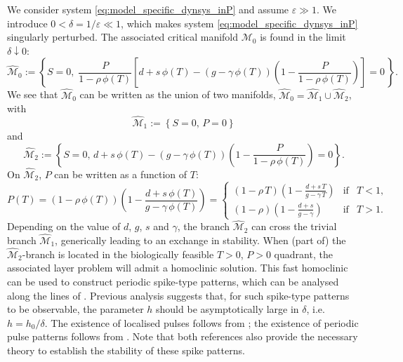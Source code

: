\documentclass[a4paper,10pt,abstract=true,parskip=true]{scrartcl}
\theoremstyle{remark}
\numberwithin{equation}{section}
\numberwithin{thm}{section}
\newcommand{\eps}{\varepsilon}
\begin{document}
We consider system \eqref{eq:model_specific_dynsys_inP} and assume $\eps \gg 1$. We introduce $0<\delta = 1/\eps \ll 1$, which makes system \eqref{eq:model_specific_dynsys_inP} singularly perturbed. The associated critical manifold $\mathcal{M}_0$ is found in the limit $\delta \downarrow 0$:
\begin{equation}\label{eq:slowtox_C0}
    \hat{\mathcal{M}}_0 := \left\{S = 0,\; \frac{P}{1 - \rho\,\phi(T)}\left[d+s\,\phi(T) - \left(g - \gamma\,\phi(T)\right)\left(1-\frac{P}{1 - \rho\,\phi(T)}\right)\right] = 0\,\right\}.
\end{equation}
We see that $\hat{\mathcal{M}}_0$ can be written as the union of two manifolds, $\hat{\mathcal{M}}_0 = \hat{\mathcal{M}}_1 \cup \hat{\mathcal{M}}_2$,
with
\begin{equation}
 \hat{\mathcal{M}}_1 := \left\{ S = 0,\,P = 0\right\}
\end{equation}
and
\begin{equation}
    \hat{\mathcal{M}}_2 := \left\{S=0,\,d+s\,\phi(T) - \left(g - \gamma\,\phi(T)\right)\left(1-\frac{P}{1 - \rho\,\phi(T)}\right) = 0\right\}.
\end{equation}
On $\hat{\mathcal{M}}_2$, $P$ can be written as a function of $T$:
\begin{equation}\label{eq:slowtox_C0_PinT}
    P(T) = \left(1-\rho\,\phi(T)\right) \left(1-\frac{d + s\, \phi(T)}{g-\gamma\,\phi(T)}\right)= \left\{ \begin{array}{rcl} \left(1-\rho\,T\right) \left(1-\frac{d + s\, T}{g-\gamma\,T}\right) & \text{if} & T<1,\\ \left(1-\rho\right) \left(1-\frac{d + s}{g-\gamma}\right) & \text{if} & T>1.\end{array}\right.
\end{equation}
Depending on the value of $d$, $g$, $s$ and $\gamma$, the branch $\hat{\mathcal{M}}_2$ can cross the trivial branch $\hat{\mathcal{M}}_1$, generically leading to an exchange in stability. When (part of) the $\hat{\mathcal{M}}_2$-branch is located in the biologically feasible $T>0$, $P>0$ quadrant, the associated layer problem will admit a homoclinic solution. This fast homoclinic can be used to construct periodic spike-type patterns, which can be analysed along the lines of \cite{DoelmanVeerman.2015,dRDR.2016}. Previous analysis \cite{DoelmanVeerman.2015} suggests that, for such spike-type patterns to be observable, the parameter $h$ should be asymptotically large in $\delta$, i.e. $h = h_0/\delta$.
The existence of localised pulses follows from \cite[Theorem 2.1]{DoelmanVeerman.2015}; the existence of periodic pulse patterns follows from \cite[Theorem 2.11]{dRDR.2016}. Note that both references also provide the necessary theory to establish the stability of these spike patterns.
\end{document}
